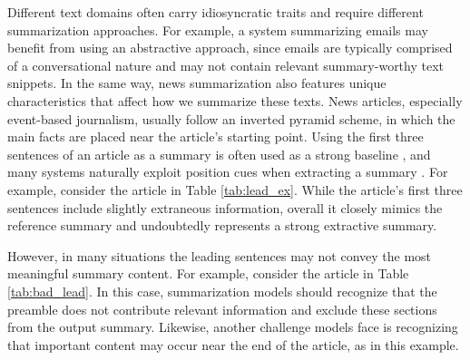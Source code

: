 Different text domains often carry idiosyncratic traits and require different summarization approaches. For example, a system summarizing emails may benefit from using an abstractive approach, since emails are typically comprised of a conversational nature and may not contain relevant summary-worthy text snippets.
In the same way, news summarization also features unique characteristics that affect how we summarize these texts. News articles, especially event-based journalism, usually follow an inverted pyramid scheme, in which the main facts are placed near the article's starting point. Using the first three sentences of an article as a summary is often used as a strong baseline \parencite{nenkova2005automatic}, and many systems naturally exploit position cues when extracting a summary \parencite{hong2014improving, schiffman}. For example, consider the article in Table \ref{tab:lead_ex}. While the article's first three sentences include slightly extraneous information, overall it closely mimics the reference summary and undoubtedly represents a strong extractive summary.

However, in many situations the leading sentences may not convey the most meaningful summary content. For example, consider the article in Table \ref{tab:bad_lead}. In this case, summarization models should recognize that the preamble does not contribute relevant information and exclude these sections from the output summary. Likewise, another challenge models face is recognizing that important content may occur near the end of the article, as in this example.

